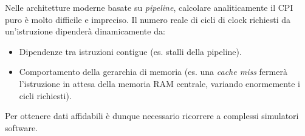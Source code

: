 \begin{remark}
Nelle architetture moderne basate su \textit{pipeline}, calcolare analiticamente il CPI puro è molto difficile e impreciso. Il numero reale di cicli di clock richiesti da un'istruzione dipenderà dinamicamente da:
\begin{itemize}
    \item Dipendenze tra istruzioni contigue (es. stalli della pipeline).
    \item Comportamento della gerarchia di memoria (es. una \textit{cache miss} fermerà l'istruzione in attesa della memoria RAM centrale, variando enormemente i cicli richiesti).
\end{itemize}
Per ottenere dati affidabili è dunque necessario ricorrere a complessi simulatori software.
\end{remark}